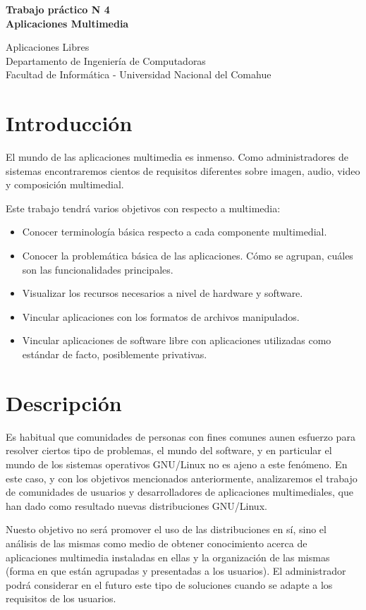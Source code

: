 \documentclass[12pt]{article}
\def\maketitle{

 \makeatletter
 {\color{bl} \centering \huge \sc \textbf{
Trabajo práctico N 4 \\
\large \vspace*{-8pt} \color{black} Aplicaciones Multimedia 
 \vspace*{8pt} }\par}
 \makeatother


 \makeatletter
 {\centering \small 
	Aplicaciones Libres\\
 	Departamento de Ingeniería de Computadoras \\
 	Facultad de Informática - Universidad Nacional del Comahue \\
 	\vspace{20pt} }
 \makeatother

}
\begin{document}
\thispagestyle{empty}
\maketitle
\setlength{\parindent}{0pt}


\section*{Introducción}
El mundo de las aplicaciones multimedia es inmenso. Como administradores de 
sistemas encontraremos cientos de requisitos diferentes sobre imagen, audio, 
video y composición multimedial. 

Este trabajo tendrá varios objetivos con respecto a multimedia:
\begin{itemize} 
\item Conocer terminología básica respecto a cada componente multimedial. 
\item Conocer la problemática básica de las aplicaciones. Cómo se agrupan, cuáles
son las funcionalidades principales. 
\item Visualizar los recursos necesarios a nivel de hardware y software.
\item Vincular aplicaciones con los formatos de archivos manipulados. 
\item Vincular aplicaciones de software libre con aplicaciones utilizadas 
como estándar de facto, posiblemente privativas. 
\end{itemize}

\section*{Descripción}
Es habitual que comunidades de personas con fines comunes aunen esfuerzo para 
resolver ciertos tipo de problemas, el mundo del software, y en particular el 
mundo de los sistemas operativos GNU/Linux no es ajeno a este fenómeno. En 
este caso, y con los objetivos mencionados anteriormente, analizaremos el 
trabajo de comunidades de usuarios y desarrolladores de aplicaciones 
multimediales, que han dado como resultado nuevas distribuciones GNU/Linux.  

Nuesto objetivo no será promover el uso de las distribuciones en sí, sino el 
análisis de las mismas como medio de obtener conocimiento acerca de 
aplicaciones multimedia instaladas en ellas y la organización de las 
mismas (forma en que están agrupadas y presentadas a los usuarios). El 
administrador podrá considerar en el futuro este tipo de soluciones cuando 
se adapte a los requisitos de los usuarios.  
\end{document}
